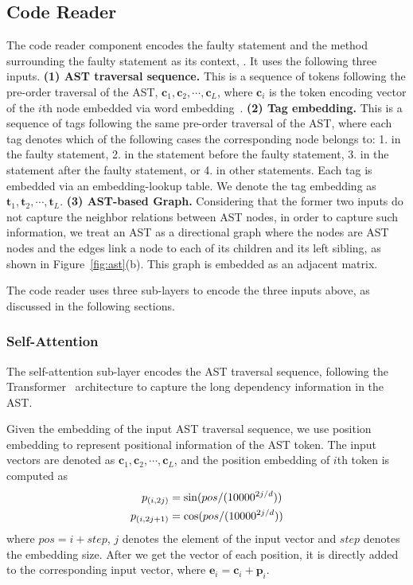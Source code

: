 \subsection{Code Reader}
The code reader component encodes the faulty statement and the method surrounding the faulty statement as its context, . It uses the following three inputs. \textbf{(1) AST traversal sequence.} This is a sequence of tokens following the pre-order traversal of the AST, $\bm{c}_1, \bm{c}_2, \cdots{}, \bm{c}_L$, where $\bm{c}_i$ is the token encoding vector of the $i$th node embedded via word embedding~\cite{Mikolov2013EfficientEO}. \textbf{(2) Tag embedding.} This is a sequence of tags following the same pre-order traversal of the AST, where each tag denotes which of the following cases the corresponding node belongs to: 1. in the faulty statement, 2. in the statement before the faulty statement, 3. in the statement after the faulty statement, or 4. in other statements. Each tag is embedded via an embedding-lookup table. We denote the tag embedding as $\bm{t}_1,\bm{t}_2,\cdots{},\bm{t}_L$. \textbf{(3) AST-based Graph.} Considering that the former two inputs do not capture the neighbor relations between AST nodes, in order to capture such information, we treat an AST as a directional graph where the nodes are AST nodes and the edges link a node to each of its children and its left sibling, as shown in Figure~\ref{fig:ast}(b). This graph is embedded as an adjacent matrix.

The code reader uses three sub-layers to encode the three inputs above, as discussed in the following sections.

\subsubsection{Self-Attention}
The self-attention sub-layer encodes the AST traversal sequence, following the Transformer~\cite{transformer} architecture to capture the long dependency information in the AST. 

Given the embedding of the input AST traversal sequence, we use position embedding to represent positional information of the AST token. The input vectors are denoted as $\bm{c}_1, \bm{c}_2, \cdots{}, \bm{c}_L$, and the position embedding of $i$th token is computed as
        \begin{align}
        \vspace{-2mm}
                 p_{(i,2j)} &= 
                    \sin (pos/(10000^{2j/d} )) \\ 
                     p_{(i,2j + 1)} &= \cos (pos/(10000^{2j/d} )) 
        \vspace{-3mm}
        \end{align}
where $pos = i + step$, $j$ denotes the element of the input vector and $step$ denotes the embedding size. After we get the vector of each position, it is directly added to the corresponding input vector, where $\bm{e}_i = \bm{c}_i + \bm{p}_i$.

